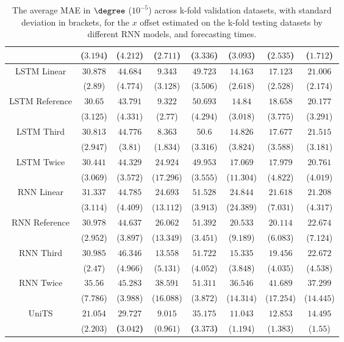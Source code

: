 \begin{table}[!ht]
{\begin{tabular}{|c|c|c|c|c|c|c|c|}
			 & ($3.194$) & ($4.212$) & ($2.711$) & ($3.336$) & ($3.093$) & ($2.535$) & ($1.712$) \\ \hline
			\multirow{2}{*}{LSTM Linear} & $30.878$ & $44.684$ & $9.343$ & $49.723$ & $14.163$ & $17.123$ & $21.006$ \\
			 & ($2.89$) & ($4.774$) & ($3.128$) & ($3.506$) & ($2.618$) & ($2.528$) & ($2.174$) \\ \hline
			\multirow{2}{*}{LSTM Reference} & $30.65$ & $43.791$ & $9.322$ & $50.693$ & $14.84$ & $18.658$ & $20.177$ \\
			 & ($3.125$) & ($4.331$) & ($2.77$) & ($4.294$) & ($3.018$) & ($3.775$) & ($3.291$) \\ \hline
			\multirow{2}{*}{LSTM Third} & $30.813$ & $44.776$ & $8.363$ & $50.6$ & $14.826$ & $17.677$ & $21.515$ \\
			 & ($2.947$) & ($3.81$) & ($1.834$) & ($3.316$) & ($3.824$) & ($3.588$) & ($3.181$) \\ \hline
			\multirow{2}{*}{LSTM Twice} & $30.441$ & $44.329$ & $24.924$ & $49.953$ & $17.069$ & $17.979$ & $20.761$ \\
			 & ($3.069$) & ($3.572$) & ($17.296$) & ($3.555$) & ($11.304$) & ($4.822$) & ($4.019$) \\ \hline
			\multirow{2}{*}{RNN Linear} & $31.337$ & $44.785$ & $24.693$ & $51.528$ & $24.844$ & $21.618$ & $21.208$ \\
			 & ($3.114$) & ($4.409$) & ($13.112$) & ($3.913$) & ($24.389$) & ($7.031$) & ($4.317$) \\ \hline
			\multirow{2}{*}{RNN Reference} & $30.978$ & $44.637$ & $26.062$ & $51.392$ & $20.533$ & $20.114$ & $22.674$ \\
			 & ($2.952$) & ($3.897$) & ($13.349$) & ($3.451$) & ($9.189$) & ($6.083$) & ($7.124$) \\ \hline
			\multirow{2}{*}{RNN Third} & $30.985$ & $46.346$ & $13.558$ & $51.722$ & $15.335$ & $19.456$ & $22.672$ \\
			 & ($2.47$) & ($4.966$) & ($5.131$) & ($4.052$) & ($3.848$) & ($4.035$) & ($4.538$) \\ \hline
			\multirow{2}{*}{RNN Twice} & $35.56$ & $45.283$ & $38.591$ & $51.311$ & $36.546$ & $41.689$ & $37.299$ \\
			 & ($7.786$) & ($3.988$) & ($16.088$) & ($3.872$) & ($14.314$) & ($17.254$) & ($14.445$) \\ \hline
			\multirow{2}{*}{UniTS} & $21.054$ & $\mathbf{29.727}$ & $9.015$ & $\mathbf{35.175}$ & $11.043$ & $12.853$ & $14.495$ \\
			 & ($2.203$) & \textbf{(}$\mathbf{3.042}$\textbf{)} & ($0.961$) & \textbf{(}$\mathbf{3.373}$\textbf{)} & ($1.194$) & ($1.383$) & ($1.55$) \\ \hline
		\end{tabular}
	}
	\caption{The average MAE in $\degree$ ($10^{-5}$) across k-fold validation datasets, with standard deviation in brackets, for the $x$ offset estimated on the k-fold testing datasets by different RNN models, and forecasting times.}
	\label{tab:all_longitude_no_abs_MAE}
\end{table}